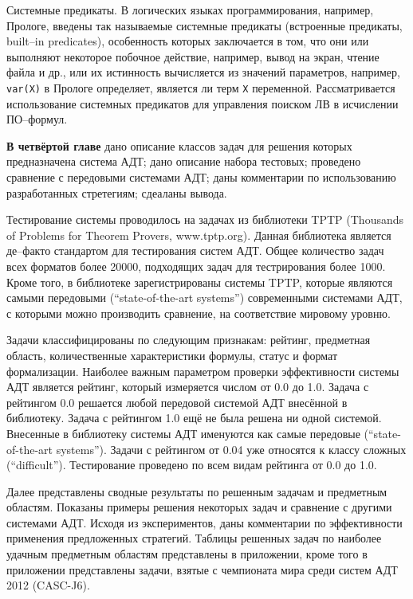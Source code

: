 \documentclass[a4paper]{report}
\begin{document}
Системные предикаты. В логических языках программирования, например, Прологе, введены так называемые системные предикаты (встроенные предикаты, built--in predicates), особенность которых заключается в том, что они или выполняют некоторое побочное действие, например, вывод на экран, чтение файла и др., или их истинность вычисляется из значений параметров, например, \texttt{var(X)} в Прологе определяет, является ли терм \texttt{X} переменной. Рассматривается использование системных предикатов для управления поиском ЛВ в исчислении ПО--формул.



\textbf{В четвёртой главе} дано описание классов задач для решения которых предназначена система АДТ; дано описание набора тестовых; проведено сравнение с передовыми системами АДТ; даны комментарии по использованию разработанных стретегиям; сдеаланы вывода.

Тестирование системы проводилось на задачах из библиотеки TPTP (Thousands of Problems for Theorem Provers, www.tptp.org). Данная библиотека является де--факто стандартом для тестирования систем АДТ. Общее количество задач всех форматов более 20000, подходящих задач для тестрирования более 1000. Кроме того,  в библиотеке зарегистрированы системы TPTP, которые являются самыми передовыми (``state-of-the-art systems'') современными системами АДТ, с которыми можно производить сравнение, на соответствие мировому уровню.

Задачи классифицированы по следующим признакам: рейтинг, предметная область, количественные характеристики формулы, статус и формат формализации. Наиболее важным параметром проверки эффективности системы АДТ является рейтинг, который измеряется числом от 0.0 до 1.0. Задача с рейтингом 0.0 решается любой передовой системой АДТ внесённой в библиотеку. Задача с рейтингом 1.0 ещё не была решена ни одной системой. Внесенные в библиотеку системы АДТ именуются как  самые передовые (``state-of-the-art systems''). Задачи с рейтингом от 0.04 уже относятся к классу сложных (``difficult''). Тестирование проведено по всем видам рейтинга от 0.0 до 1.0.

Далее представлены сводные результаты по решенным задачам и предметным областям. Показаны примеры решения некоторых задач и сравнение с другими системами АДТ. Исходя из экспериментов, даны комментарии по эффективности применения предложенных стратегий. Таблицы решенных задач по наиболее удачным предметным областям представлены в приложении, кроме того в приложении представлены задачи, взятые с чемпионата мира среди систем АДТ 2012 (CASC-J6).
\end{document}

